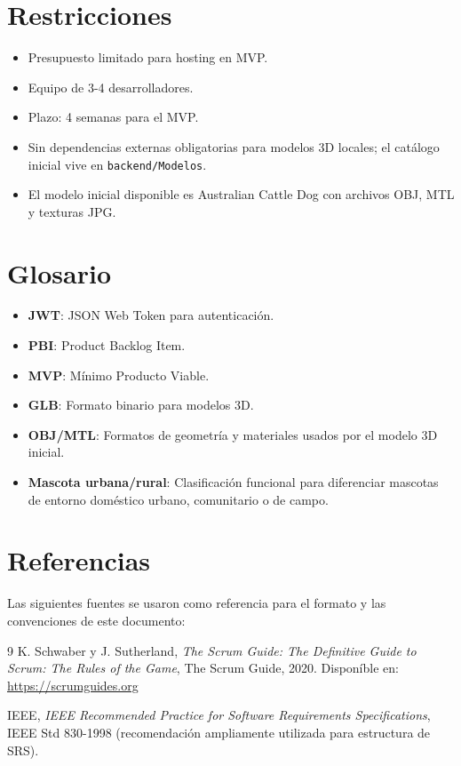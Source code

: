 \documentclass[12pt,a4paper]{article}
\begin{document}
\section{Restricciones}
\begin{itemize}[leftmargin=*]
    \item Presupuesto limitado para hosting en MVP.
    \item Equipo de 3-4 desarrolladores.
    \item Plazo: 4 semanas para el MVP.
    \item Sin dependencias externas obligatorias para modelos 3D locales; el cat\'alogo inicial vive en \texttt{backend/Modelos}.
    \item El modelo inicial disponible es Australian Cattle Dog con archivos OBJ, MTL y texturas JPG.
\end{itemize}

\section{Glosario}
\begin{itemize}[leftmargin=*]
    \item \textbf{JWT}: JSON Web Token para autenticaci\'on.
    \item \textbf{PBI}: Product Backlog Item.
    \item \textbf{MVP}: M\'inimo Producto Viable.
    \item \textbf{GLB}: Formato binario para modelos 3D.
    \item \textbf{OBJ/MTL}: Formatos de geometr\'ia y materiales usados por el modelo 3D inicial.
    \item \textbf{Mascota urbana/rural}: Clasificaci\'on funcional para diferenciar mascotas de entorno dom\'estico urbano, comunitario o de campo.
\end{itemize}
\newpage
\section{Referencias}
Las siguientes fuentes se usaron como referencia para el formato y las convenciones de este documento:
\begin{thebibliography}{9}
K. Schwaber y J. Sutherland,
\textit{The Scrum Guide: The Definitive Guide to Scrum: The Rules of the Game},
The Scrum Guide, 2020. Dispon\'ible en: \url{https://scrumguides.org}

IEEE,
\textit{IEEE Recommended Practice for Software Requirements Specifications},
IEEE Std 830-1998 (recomendaci\'on ampliamente utilizada para estructura de SRS).
\end{thebibliography}
\end{document}
